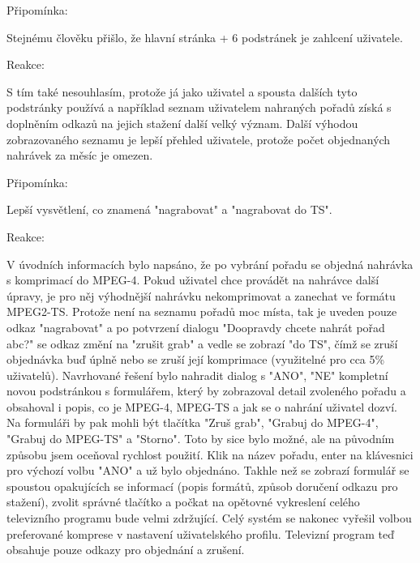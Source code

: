 \vspace{10pt}

\begin{bf}Připomínka:\end{bf} Stejnému člověku přišlo, že hlavní stránka + 6 podstránek je zahlcení uživatele. 

\begin{bf}Reakce:\end{bf} S tím také nesouhlasím, protože já jako uživatel a spousta dalších tyto podstránky používá a například seznam uživatelem nahraných pořadů získá s doplněním odkazů na jejich stažení další velký význam. Další výhodou zobrazovaného seznamu je lepší přehled uživatele, protože počet objednaných nahrávek za měsíc je omezen.

\vspace{10pt}

\begin{bf}Připomínka:\end{bf} Lepší vysvětlení, co znamená "nagrabovat" a "nagrabovat do TS". 

\begin{bf}Reakce:\end{bf} V úvodních informacích bylo napsáno, že po vybrání pořadu se objedná nahrávka s komprimací do MPEG-4. Pokud uživatel chce provádět na nahrávce další úpravy, je pro něj výhodnější nahrávku nekomprimovat a zanechat ve formátu MPEG2-TS. Protože není na seznamu pořadů moc místa, tak je uveden pouze odkaz "nagrabovat" a po potvrzení dialogu "Doopravdy chcete nahrát pořad abc?" se odkaz změní na "zrušit grab" a vedle se zobrazí "do TS", čímž se zruší objednávka buď úplně nebo se zruší její komprimace (využitelné pro cca 5\% uživatelů). Navrhované řešení bylo nahradit dialog s "ANO", "NE" kompletní novou podstránkou s formulářem, který by zobrazoval detail zvoleného pořadu a obsahoval i popis, co je MPEG-4, MPEG-TS a jak se o nahrání uživatel dozví. Na formuláři by pak mohli být tlačítka "Zruš grab", "Grabuj do MPEG-4", "Grabuj do MPEG-TS" a "Storno". Toto by sice bylo možné, ale na původním způsobu jsem oceňoval rychlost použití. Klik na název pořadu, enter na klávesnici pro výchozí volbu "ANO" a už bylo objednáno. Takhle než se zobrazí formulář se spoustou opakujících se informací (popis formátů, způsob doručení odkazu pro stažení), zvolit správné tlačítko a počkat na opětovné vykreslení celého televizního programu bude velmi zdržující. Celý systém se nakonec vyřešil volbou preferované komprese v nastavení uživatelského profilu. Televizní program teď obsahuje pouze odkazy pro objednání a zrušení.

